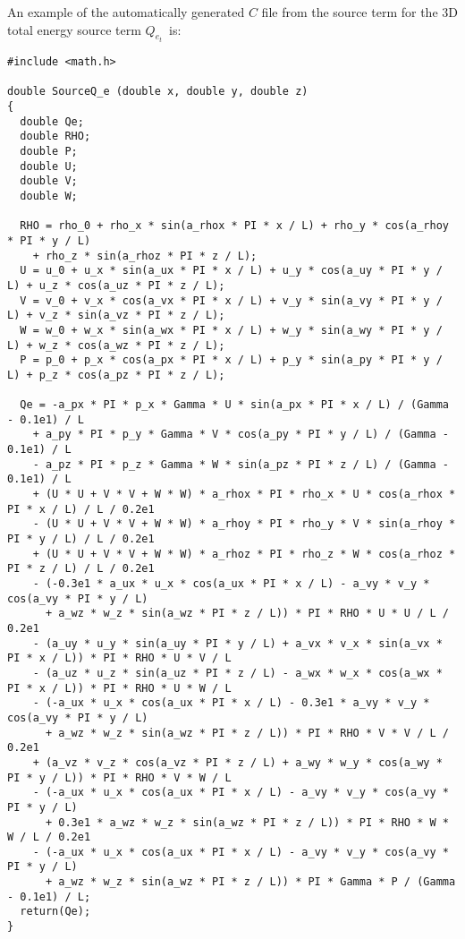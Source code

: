 \documentclass[10pt]{article}
\begin{document}
An example of the automatically generated $C$ file from the source term for the 3D total energy source term $Q_{e_t}$~is:

\begin{small}
\begin{verbatim}
#include <math.h>

double SourceQ_e (double x, double y, double z)
{
  double Qe;
  double RHO;
  double P;
  double U;
  double V;
  double W;

  RHO = rho_0 + rho_x * sin(a_rhox * PI * x / L) + rho_y * cos(a_rhoy * PI * y / L)
    + rho_z * sin(a_rhoz * PI * z / L);
  U = u_0 + u_x * sin(a_ux * PI * x / L) + u_y * cos(a_uy * PI * y / L) + u_z * cos(a_uz * PI * z / L);
  V = v_0 + v_x * cos(a_vx * PI * x / L) + v_y * sin(a_vy * PI * y / L) + v_z * sin(a_vz * PI * z / L);
  W = w_0 + w_x * sin(a_wx * PI * x / L) + w_y * sin(a_wy * PI * y / L) + w_z * cos(a_wz * PI * z / L);
  P = p_0 + p_x * cos(a_px * PI * x / L) + p_y * sin(a_py * PI * y / L) + p_z * cos(a_pz * PI * z / L);

  Qe = -a_px * PI * p_x * Gamma * U * sin(a_px * PI * x / L) / (Gamma - 0.1e1) / L
    + a_py * PI * p_y * Gamma * V * cos(a_py * PI * y / L) / (Gamma - 0.1e1) / L
    - a_pz * PI * p_z * Gamma * W * sin(a_pz * PI * z / L) / (Gamma - 0.1e1) / L
    + (U * U + V * V + W * W) * a_rhox * PI * rho_x * U * cos(a_rhox * PI * x / L) / L / 0.2e1
    - (U * U + V * V + W * W) * a_rhoy * PI * rho_y * V * sin(a_rhoy * PI * y / L) / L / 0.2e1
    + (U * U + V * V + W * W) * a_rhoz * PI * rho_z * W * cos(a_rhoz * PI * z / L) / L / 0.2e1
    - (-0.3e1 * a_ux * u_x * cos(a_ux * PI * x / L) - a_vy * v_y * cos(a_vy * PI * y / L)
      + a_wz * w_z * sin(a_wz * PI * z / L)) * PI * RHO * U * U / L / 0.2e1
    - (a_uy * u_y * sin(a_uy * PI * y / L) + a_vx * v_x * sin(a_vx * PI * x / L)) * PI * RHO * U * V / L
    - (a_uz * u_z * sin(a_uz * PI * z / L) - a_wx * w_x * cos(a_wx * PI * x / L)) * PI * RHO * U * W / L
    - (-a_ux * u_x * cos(a_ux * PI * x / L) - 0.3e1 * a_vy * v_y * cos(a_vy * PI * y / L)
      + a_wz * w_z * sin(a_wz * PI * z / L)) * PI * RHO * V * V / L / 0.2e1
    + (a_vz * v_z * cos(a_vz * PI * z / L) + a_wy * w_y * cos(a_wy * PI * y / L)) * PI * RHO * V * W / L
    - (-a_ux * u_x * cos(a_ux * PI * x / L) - a_vy * v_y * cos(a_vy * PI * y / L)
      + 0.3e1 * a_wz * w_z * sin(a_wz * PI * z / L)) * PI * RHO * W * W / L / 0.2e1
    - (-a_ux * u_x * cos(a_ux * PI * x / L) - a_vy * v_y * cos(a_vy * PI * y / L)
      + a_wz * w_z * sin(a_wz * PI * z / L)) * PI * Gamma * P / (Gamma - 0.1e1) / L;
  return(Qe);
}
\end{verbatim}
\end{small}
 

\end{document}
